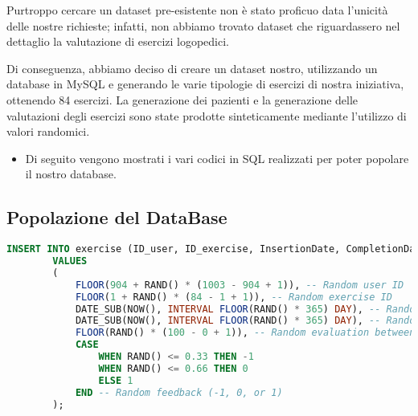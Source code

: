\documentclass{article}
\begin{document}
    Purtroppo cercare un dataset pre-esistente non è stato proficuo data l'unicità delle nostre richieste; infatti, non abbiamo trovato dataset che riguardassero nel dettaglio la valutazione di esercizi logopedici.

    Di conseguenza, abbiamo deciso di creare un dataset nostro, utilizzando un database in MySQL e generando le varie tipologie di esercizi di nostra iniziativa, ottenendo 84 esercizi. La generazione dei pazienti e la generazione delle valutazioni degli esercizi sono state prodotte sinteticamente mediante l'utilizzo di valori randomici.

    \begin{itemize}
        \item Di seguito vengono mostrati i vari codici in SQL realizzati per poter popolare il nostro database.
    \end{itemize}


    \pagebreak

    \subsection{Popolazione del DataBase}

    \begin{lstlisting}[language=SQL, breaklines, caption=Generazione Casuale esecuzione esercizio]
        INSERT INTO exercise (ID_user, ID_exercise, InsertionDate, CompletionDate, Evaluation, Feedback)
        VALUES
        (
            FLOOR(904 + RAND() * (1003 - 904 + 1)), -- Random user ID
            FLOOR(1 + RAND() * (84 - 1 + 1)), -- Random exercise ID
            DATE_SUB(NOW(), INTERVAL FLOOR(RAND() * 365) DAY), -- Random date within the past year
            DATE_SUB(NOW(), INTERVAL FLOOR(RAND() * 365) DAY), -- Random completion date within the past year
            FLOOR(RAND() * (100 - 0 + 1)), -- Random evaluation between 0 and 100
            CASE
                WHEN RAND() <= 0.33 THEN -1
                WHEN RAND() <= 0.66 THEN 0
                ELSE 1
            END -- Random feedback (-1, 0, or 1)
        );
    \end{lstlisting}
\end{document}
